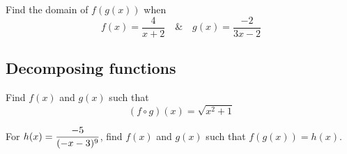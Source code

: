 \begin{exercise}
Find the domain of $f(g(x))$ when
\[
f(x)=\frac{4}{x+2}\quad\&\quad g(x)=\frac{-2}{3x-2}
\]
\end{exercise}
\begin{solution}[2.5in]

\end{solution}

\subsection{Decomposing functions}

\begin{exercise}
Find $f(x)$ and $g(x)$ such that
\[
(f\circ g)(x)=\sqrt{x^2+1}
\]
\end{exercise}
\begin{solution}[3in]

\end{solution}

\newpage

\begin{exercise}
For $\displaystyle h(x)=\frac{-5}{(-x-3)^9}$, find $f(x)$ and $g(x)$ such that
$f(g(x))=h(x)$.
\end{exercise}
\begin{solution}[3in]

\end{solution}